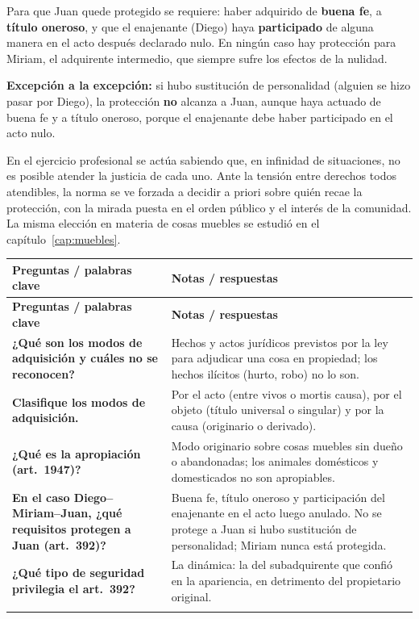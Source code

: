 \documentclass[12pt,oneside]{book}
\makeatletter
\renewcommand{\arraystretch}{1.25}
\newcommand{\cq}[2]{\textbf{#1} & #2 \\[0.45em]}
\newcommand{\cornell}[3]{%
\par\bigskip\noindent{\large\bfseries Cuadro Cornell: #1}\par\nopagebreak\smallskip
\begingroup
\small
\renewcommand{\arraystretch}{1.15}
\begin{longtable}{@{}>{\raggedright\arraybackslash}p{0.26\textwidth}>{\raggedright\arraybackslash}p{0.66\textwidth}@{}}
\toprule
\textbf{Preguntas / palabras clave} & \textbf{Notas / respuestas} \\
\midrule
\endfirsthead
\toprule
\textbf{Preguntas / palabras clave} & \textbf{Notas / respuestas} \\
\midrule
\endhead
#2
\midrule
\multicolumn{2}{@{}p{\dimexpr0.92\textwidth+2\tabcolsep\relax}@{}}{\vspace{0.2em}\textbf{Resumen.} #3\vspace{0.2em}} \\
\bottomrule
\end{longtable}
\endgroup
}
\makeatother
\begin{document}
Para que Juan quede protegido se requiere: haber adquirido de \textbf{buena fe}, a \textbf{título oneroso}, y que el enajenante (Diego) haya \textbf{participado} de alguna manera en el acto después declarado nulo. En ningún caso hay protección para Miriam, el adquirente intermedio, que siempre sufre los efectos de la nulidad.

\begin{importante}
\textbf{Excepción a la excepción:} si hubo sustitución de personalidad (alguien se hizo pasar por Diego), la protección \textbf{no} alcanza a Juan, aunque haya actuado de buena fe y a título oneroso, porque el enajenante debe haber participado en el acto nulo.
\end{importante}

\begin{nota}
En el ejercicio profesional se actúa sabiendo que, en infinidad de situaciones, no es posible atender la justicia de cada uno. Ante la tensión entre derechos todos atendibles, la norma se ve forzada a decidir a priori sobre quién recae la protección, con la mirada puesta en el orden público y el interés de la comunidad. La misma elección en materia de cosas muebles se estudió en el capítulo~\ref{cap:muebles}.
\end{nota}

\cornell{adquisición del dominio}{
\cq{¿Qué son los modos de adquisición y cuáles no se reconocen?}{Hechos y actos jurídicos previstos por la ley para adjudicar una cosa en propiedad; los hechos ilícitos (hurto, robo) no lo son.}
\cq{Clasifique los modos de adquisición.}{Por el acto (entre vivos o mortis causa), por el objeto (título universal o singular) y por la causa (originario o derivado).}
\cq{¿Qué es la apropiación (art.~1947)?}{Modo originario sobre cosas muebles sin dueño o abandonadas; los animales domésticos y domesticados no son apropiables.}
\cq{En el caso Diego–Miriam–Juan, ¿qué requisitos protegen a Juan (art.~392)?}{Buena fe, título oneroso y participación del enajenante en el acto luego anulado. No se protege a Juan si hubo sustitución de personalidad; Miriam nunca está protegida.}
\cq{¿Qué tipo de seguridad privilegia el art.~392?}{La dinámica: la del subadquirente que confió en la apariencia, en detrimento del propietario original.}
}{El dominio se adquiere por modos originarios (apropiación, prescripción) o derivados (título y modo). El subadquirente de inmuebles de buena fe y a título oneroso queda protegido frente a la nulidad del acto anterior si el titular participó en él, con prioridad de la seguridad dinámica.}
\end{document}
